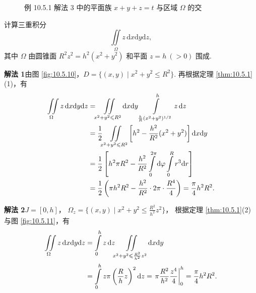 \begin{figure}[htbp]
  \caption{例 10.5.1 解法 3 中的平面族 $x + y + z = t$ 与区域 $\Omega$ 的交}\label{fig:10.5.7}
  \label{fig:10.5.8}
  \label{fig:10.5.9}
\end{figure}
\begin{example}\label{ex:10.5.2}
计算三重积分
\[
\iint \limits_{\Omega} z \, \mathrm{d}x \mathrm{d}y \mathrm{d}z,
\]
其中 $\Omega$ 由圆锥面 $R^2 z^2 = h^2 (x^2 + y^2)$ 和平面 $z = h\ (>0)$ 围成.
\end{example}

\noindent\textbf{解法 1}\quad 由图 \ref{fig:10.5.10}，$D = \{(x, y) \mid x^2 + y^2 \leqslant R^2\}$.
再根据定理 \ref{thm:10.5.1}(1)，有
\begin{align*}
\iint \limits_{\Omega} z \, \mathrm{d}x \mathrm{d}y \mathrm{d}z
&= \iint \limits_{x^2 + y^2 \leqslant R^2} \mathrm{d}x \mathrm{d}y
   \int \limits_{\frac{h}{R}(x^2 + y^2)^{1/2}}^{h} z \, \mathrm{d}z \notag\\
&= \frac{1}{2} \iint \limits_{x^2 + y^2 \leqslant R^2}
   \left[ h^2 - \frac{h^2}{R^2}(x^2 + y^2) \right] \mathrm{d}x \mathrm{d}y \notag\\
&= \frac{1}{2} \left[ h^2 \pi R^2 - \frac{h^2}{R^2}
   \int \limits_0^{2\pi} \mathrm{d}\varphi \int \limits_0^R r^3 \mathrm{d}r \right] \notag\\
&= \frac{1}{2} \left( \pi h^2 R^2 - \frac{h^2}{R^2} \cdot 2\pi \cdot \frac{R^4}{4} \right)
 = \frac{\pi}{4} h^2 R^2.
\end{align*}

\noindent\textbf{解法 2}\quad $J = [0, h]$，
$\Omega_z = \bigl\{ (x, y) \mid x^2 + y^2 \leqslant \frac{R^2}{h^2} z^2 \bigr\}$，
根据定理 \ref{thm:10.5.1}(2) 与图 \ref{fig:10.5.11}，有
\begin{align*}
\iint \limits_{\Omega} z \, \mathrm{d}x \mathrm{d}y \mathrm{d}z
&= \int \limits_0^h z \, \mathrm{d}z \iint \limits_{x^2 + y^2 \leqslant \frac{R^2}{h^2} z^2}
  \mathrm{d}x \mathrm{d}y \notag\\
&= \int \limits_0^h z \pi \left( \frac{R}{h} z \right)^2 \mathrm{d}z
 = \left. \pi \frac{R^2}{h^2} \frac{z^4}{4} \right|_0^h
 = \frac{\pi}{4} h^2 R^2.
\end{align*}

